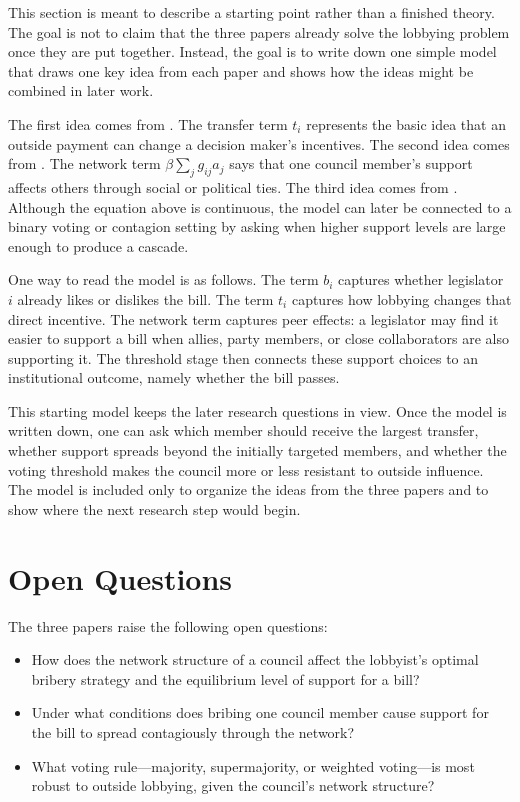 \documentclass[11pt,letterpaper]{article}
\begin{document}
This section is meant to describe a starting point rather than a finished theory. The goal is not to claim that the three papers already solve the lobbying problem once they are put together. Instead, the goal is to write down one simple model that draws one key idea from each paper and shows how the ideas might be combined in later work.

The first idea comes from \citet{shleifer1993}. The transfer term $t_i$ represents the basic idea that an outside payment can change a decision maker's incentives. The second idea comes from \citet{galeotti2020}. The network term $\beta \sum_j g_{ij} a_j$ says that one council member's support affects others through social or political ties. The third idea comes from \citet{morris2000}. Although the equation above is continuous, the model can later be connected to a binary voting or contagion setting by asking when higher support levels are large enough to produce a cascade.

One way to read the model is as follows. The term $b_i$ captures whether legislator $i$ already likes or dislikes the bill. The term $t_i$ captures how lobbying changes that direct incentive. The network term captures peer effects: a legislator may find it easier to support a bill when allies, party members, or close collaborators are also supporting it. The threshold stage then connects these support choices to an institutional outcome, namely whether the bill passes.

This starting model keeps the later research questions in view. Once the model is written down, one can ask which member should receive the largest transfer, whether support spreads beyond the initially targeted members, and whether the voting threshold makes the council more or less resistant to outside influence. The model is included only to organize the ideas from the three papers and to show where the next research step would begin.

\section{Open Questions}
\label{sec:concl}

The three papers raise the following open questions:
\begin{itemize}
    \item How does the network structure of a council affect the lobbyist's optimal bribery strategy and the equilibrium level of support for a bill?
    \item Under what conditions does bribing one council member cause support for the bill to spread contagiously through the network?
    \item What voting rule---majority, supermajority, or weighted voting---is most robust to outside lobbying, given the council's network structure?
\end{itemize}
\end{document}
